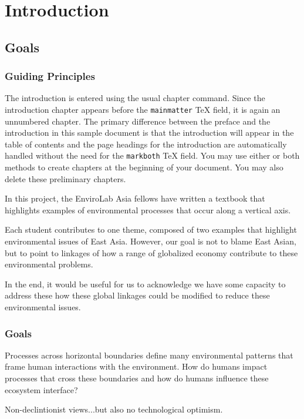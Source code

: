 \chapter{Introduction}

\section{Goals}

\subsection{Guiding Principles}

The introduction is entered using the usual chapter command. Since
the introduction chapter appears before the \verb|mainmatter| TeX
field, it is again an unnumbered chapter. The primary difference
between the preface and the introduction in this sample document
is that the introduction will appear in the table of contents and
the page headings for the introduction are automatically handled
without the need for the \verb|markboth| TeX field. You may use
either or both methods to create chapters at the beginning of your
document. You may also delete these preliminary chapters.

In this project, the EnviroLab Asia fellows have written a textbook that highlights examples of environmental processes that occur along a vertical axis. 

Each student contributes to one theme, composed of two examples that highlight environmental issues of East Asia. However, our goal is not to blame East Asian, but to point to linkages of how a range of globalized economy contribute to these environmental problems. 

In the end, it would be useful for us to acknowledge we have some capacity to address these how these global linkages could be modified to reduce these environmental issues. 

\subsection{Goals}

Processes across horizontal boundaries define many environmental patterns that frame human interactions with the environment. How do humans impact processes that cross these boundaries and how do humans influence these ecosystem interface?

Non-declintionist views...but also no technological optimism. 

